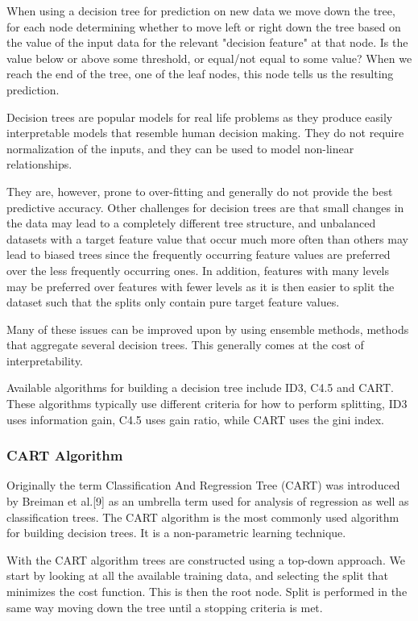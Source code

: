 \documentclass[11pt]{article}
\begin{document}
When using a decision tree for prediction on new data we move down the tree, for each node determining whether to move left or right down the tree based on the value of the input data for the relevant
"decision feature" at that node. Is the value below or above some
threshold, or equal/not equal to some value? When we reach the end of
the tree, one of the leaf nodes, this node tells us the resulting
prediction.

Decision trees are popular models for real life problems as they produce
easily interpretable models that resemble human decision making. They do
not require normalization of the inputs, and they can be used to model
non-linear relationships.

They are, however, prone to over-fitting and generally do not provide the
best predictive accuracy. Other challenges for decision trees are that
small changes in the data may lead to a completely different tree
structure, and unbalanced datasets with a target feature value that
occur much more often than others may lead to biased trees since
the frequently occurring feature values are preferred over the less
frequently occurring ones. In addition, features with many levels may be
preferred over features with fewer levels as it is then easier to split
the dataset such that the splits only contain pure target feature
values.

Many of these issues can be improved upon by using ensemble methods,
methods that aggregate several decision trees. This generally comes at
the cost of interpretability.

Available algorithms for building a decision tree include ID3, C4.5 and
CART. These algorithms typically use different criteria for how to
perform splitting, ID3 uses information gain, C4.5 uses gain ratio,
while CART uses the gini index. 

    \hypertarget{cart-algorithm}{%
	\subsubsection{CART Algorithm}\label{cart-algorithm}}
 Originally the term Classification And Regression Tree (CART) was introduced by Breiman
et al.{[}9{]} as an umbrella term used for analysis of regression as well
as classification trees. The CART algorithm is the most commonly used
algorithm for building decision trees. It is a non-parametric learning
technique.

With the CART algorithm trees are constructed using a top-down approach.
We start by looking at all the available training data, and selecting
the split that minimizes the cost function. This is then the root node.
Split is performed in the same way moving down the tree until a stopping
criteria is met.
\end{document}
